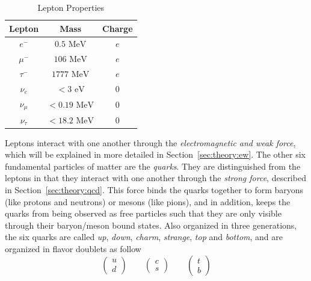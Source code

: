 \begin{table}[h!]
\begin{center}
\begin{tabular}{|c|c|c|}%
\hline
Lepton        & Mass           & Charge \\%
\hline
$e^{-}$      & $0.5 \mbox{ MeV}$      & $e$ \\%
$\mu^{-}$    & $106 \mbox{ MeV}$      & $e$ \\%
$\tau^{-}$   & $1777 \mbox{ MeV}$     & $e$ \\%
\hline                                      
$\nu_{e}$    & $< 3 \mbox{ eV}$       & $0$ \\%
$\nu_{\mu}$  & $< 0.19 \mbox{ MeV}$   & $0$ \\%
$\nu_{\tau}$ & $< 18.2 \mbox{ MeV}$   & $0$  \\%
\hline
\end{tabular}
\end{center}
\caption{Lepton Properties}
\label{table:theory:lepprop}
\end{table}
Leptons interact with one another through the \emph{electromagnetic and weak force}, which will be explained in more detailed in Section~\ref{sec:theory:ew}.\newline
The other six fundamental particles of matter are the \emph{quarks}. They are distinguished from the leptons in that they interact with one another through the \emph{strong force}, described in Section~\ref{sec:theory:qcd}. This force binds the quarks together to form baryons (like protons and neutrons) or mesons (like pions), and in addition, keeps the quarks from being observed as free particles such that they are only visible through their baryon/meson bound states. Also organized in three generations, the six quarks are called \textit{up}, \textit{down}, \textit{charm}, \textit{strange}, \textit{top} and \textit{bottom}, and are organized in flavor doublets as follow
\begin{equation}
\label{eqn:quark_flavor_doublets}
\begin{pmatrix} u \\ d \end{pmatrix} \qquad
\begin{pmatrix} c \\ s \end{pmatrix} \qquad
\begin{pmatrix} t \\ b \end{pmatrix}
\end{equation}
